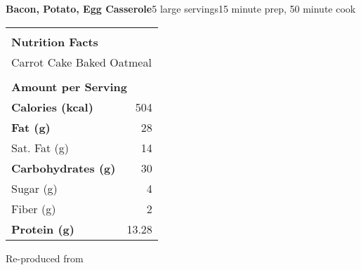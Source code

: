 \documentclass[../recipe-collections/cooking.tex]{subfiles}
\begin{document}
\begin{recipe}{\textbf{Bacon, Potato, Egg Casserole}}{5 large servings}{15 minute prep, 50 minute cook}
  \bigskip
  \centering
  \begin{tabular}{|lr|}
    \hline
                                        &                                       \\
    \multicolumn{2}{|l|}{\huge{\textbf{\textrm{Nutrition Facts}}}}              \\
    \multicolumn{2}{|l|}{\textrm{Carrot Cake Baked Oatmeal}}                               \\ 
                                        &                                       \\
    \multicolumn{2}{|l|}{\footnotesize{\textbf{\textrm{Amount per Serving}}}}   \\ \hline
    \textbf{\textrm{Calories (kcal)}}   & \textrm{504}                          \\ \hline
    \textbf{\textrm{Fat (g)}}           & \textrm{28}                           \\ \hline
    \hspace{2mm} \textrm{Sat. Fat (g)}     & \textrm{14}                            \\ \hline
    \textbf{\textrm{Carbohydrates (g)}} & \textrm{30}                            \\ \hline
    \hspace{2mm} \textrm{Sugar (g)}     & \textrm{4}                            \\ \hline
    \hspace{2mm} \textrm{Fiber (g)}     & \textrm{2}                            \\ \hline
    \textbf{\textrm{Protein (g)}} & \textrm{13.28}                            \\ \hline
  \end{tabular}

  \freeform{}\hrulefill{}
  

\end{recipe}

Re-produced from  
\autocite{TwoPeasAndTheirPod_BaconPotatoEggCasserole_2020}
\end{document}
